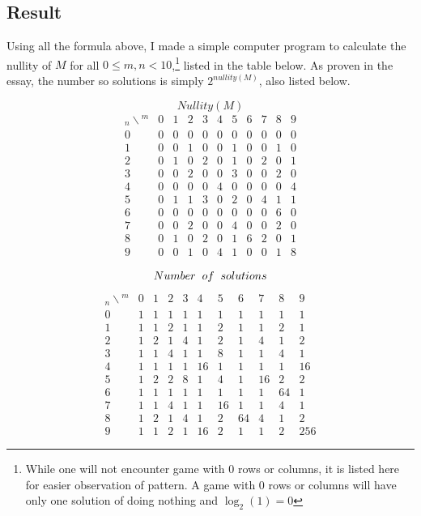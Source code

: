\documentclass[a4paper, 12pt]{article}
\begin{document}
\subsection{Result}
Using all the formula above, I made a simple computer program to calculate the nullity of $M$ for all $0\leq m, n<10$,\footnote{While one will not encounter game with 0 rows or columns, it is listed here for easier observation of pattern. A game with 0 rows or columns will have only one solution of doing nothing and $\log_2(1) = 0$} listed in the table below. As proven in the essay, the number so solutions is simply $2^{nullity(M)}$, also listed below.
\begin{singlespace}
\begin{samepage}
\[
Nullity(M)\]
\[
\begin{array}{c|cccccccccc}
{}_n\backslash{}^m&0&1&2&3&4&5&6&7&8&9\\\hline
0&0&0&0&0&0&0&0&0&0&0\\
1&0&0&1&0&0&1&0&0&1&0\\
2&0&1&0&2&0&1&0&2&0&1\\
3&0&0&2&0&0&3&0&0&2&0\\
4&0&0&0&0&4&0&0&0&0&4\\
5&0&1&1&3&0&2&0&4&1&1\\
6&0&0&0&0&0&0&0&0&6&0\\
7&0&0&2&0&0&4&0&0&2&0\\
8&0&1&0&2&0&1&6&2&0&1\\
9&0&0&1&0&4&1&0&0&1&8
\end{array}
\]
\end{samepage}
\vspace{1cm}
\begin{samepage}
\[
Number\hspace{0.2cm}of\hspace{0.2cm}solutions\]
\[
\begin{array}{c|cccccccccc}
{}_n\backslash{}^m&0&1&2&3&4&5&6&7&8&9\\\hline
0&1&1&1&1&1&1&1&1&1&1\\
1&1&1&2&1&1&2&1&1&2&1\\
2&1&2&1&4&1&2&1&4&1&2\\
3&1&1&4&1&1&8&1&1&4&1\\
4&1&1&1&1&16&1&1&1&1&16\\
5&1&2&2&8&1&4&1&16&2&2\\
6&1&1&1&1&1&1&1&1&64&1\\
7&1&1&4&1&1&16&1&1&4&1\\
8&1&2&1&4&1&2&64&4&1&2\\
9&1&1&2&1&16&2&1&1&2&256
\end{array}
\]
\end{samepage}
\end{singlespace}
\end{document}
